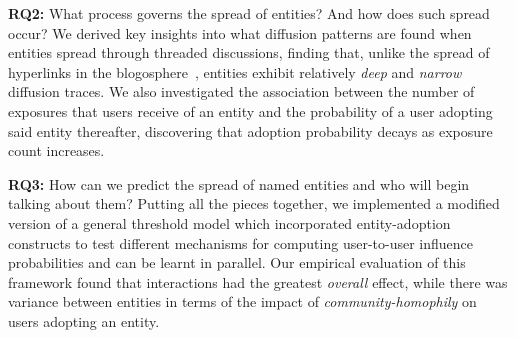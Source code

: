\documentclass[sigconf,anonymous,review]{acmart}
\begin{document}
 \textbf{RQ2:} What process governs the spread of entities? And how does such spread occur?
We derived key insights into what diffusion patterns are found when entities spread through threaded discussions,  finding that, unlike the spread of hyperlinks in the blogosphere~\cite{leskovec2007patterns}, entities exhibit relatively \emph{deep} and \emph{narrow} diffusion traces.
We also investigated the association between the number of exposures that users receive of an entity and the probability of a user adopting said entity thereafter, discovering that adoption probability decays as exposure count increases.

 \textbf{RQ3:} How can we predict the spread of named entities and who will begin talking about them?	
Putting all the pieces together, we implemented a modified version of a general threshold model which incorporated entity-adoption constructs to test different mechanisms for computing user-to-user influence probabilities and can be learnt in parallel.
Our empirical evaluation of this framework found that interactions had the greatest \emph{overall} effect, while there was variance between entities in terms of the impact of \emph{community-homophily} on users adopting an entity.

\end{document}
